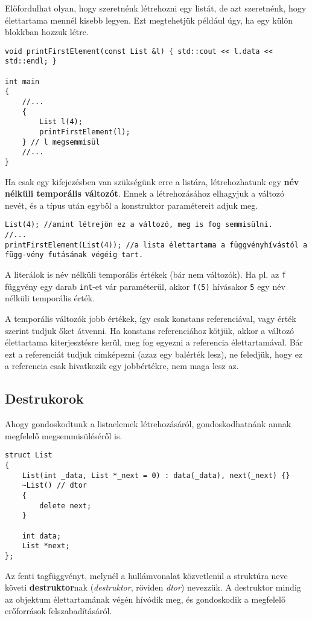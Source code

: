 \documentclass[a4paper,11.5pt,table]{article}
\begin{document}
	\medskip
	Előfordulhat olyan, hogy szeretnénk létrehozni egy listát, de azt szeretnénk, hogy élettartama mennél kisebb legyen. Ezt megtehetjük például úgy, ha egy külön blokkban hozzuk létre.
	\begin{lstlisting}
void printFirstElement(const List &l) { std::cout << l.data << std::endl; }

int main
{
	//...
	{
		List l(4);
		printFirstElement(l);
	} // l megsemmisül
	//...
}
	\end{lstlisting}
	Ha csak egy kifejezésben van szükségünk erre a listára, létrehozhatunk egy \textbf{név nélküli temporális változót}. Ennek a létrehozásához elhagyjuk a változó nevét, és a típus után egyből a konstruktor paramétereit adjuk meg.
	\begin{lstlisting}
List(4); //amint létrejön ez a változó, meg is fog semmisülni.
//...
printFirstElement(List(4)); //a lista élettartama a függvényhívástól a függ-vény futásának végéig tart.
	\end{lstlisting}
	\begin{note}
    A literálok is név nélküli temporális értékek (bár nem változók). Ha pl. az \texttt{f} függvény egy darab \texttt{int}-et vár paraméterül, akkor \texttt{f(5)} hívásakor \texttt{5} egy név nélküli temporális érték.
	\end{note}
	\begin{note}
		A temporális változók jobb értékek, így csak konstans referenciával, vagy érték szerint tudjuk őket átvenni. Ha konstans referenciához kötjük, akkor a változó élettartama kiterjesztésre kerül, meg fog egyezni a referencia élettartamával. Bár ezt a referenciát tudjuk címképezni (azaz egy balérték lesz), ne feledjük, hogy ez a referencia csak hivatkozik egy jobbértékre, nem maga lesz az.
	\end{note}
	\subsection{Destrukorok}
	Ahogy gondoskodtunk a listaelemek létrehozásáról, gondoskodhatnánk annak megfelelő megsemmisüléséről is.
	\begin{lstlisting}
struct List
{
	List(int _data, List *_next = 0) : data(_data), next(_next) {}
	~List() // dtor
	{
		delete next;
	}
	
	int data;
	List *next;
};
	\end{lstlisting}
	Az fenti tagfüggvényt, melynél a hullámvonalat közvetlenül a struktúra neve követi \textbf{destruktor}nak (\textit{destruktor}, röviden \textit{dtor}) nevezzük. A destruktor mindig az objektum élettartamának végén hívódik meg, és gondoskodik a megfelelő erőforrások felszabadításáról. 
	
\end{document}
